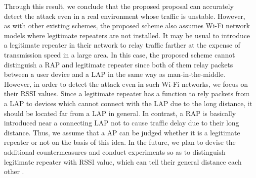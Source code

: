 \documentclass[conference]{IEEEtran}
\begin{document}
Through this result, we conclude that the proposed proposal can accurately detect the attack even in a real environment whose traffic is unstable.
However, as with other existing schemes, the proposed scheme also assumes Wi-Fi network models where legitimate repeaters are not installed.
It may be usual to introduce a legitimate repeater in their network to relay traffic farther at the expense of transmission speed in a large area.
In this case, the proposed scheme cannot distinguish a RAP and legitimate repeater since both of them relay packets between a user device and a LAP in the same way as man-in-the-middle.
However, in order to detect the attack even in such Wi-Fi networks, we focus on their RSSI values.
Since a legitimate repeater has a function to rely packets from a LAP to devices which cannot connect with the LAP due to the long distance, it should be located far from a LAP in general.
In contrast, a RAP is basically introduced near a connecting LAP not to cause traffic delay due to their long distance.
Thus, we assume that a AP can be judged whether it is a legitimate repeater or not on the basis of this idea.
In the future, we plan to devise the additional countermeasures and conduct experiments so as to distinguish legitimate repeater with RSSI value, which can tell their general distance each other \cite{rssi}.
\end{document}
